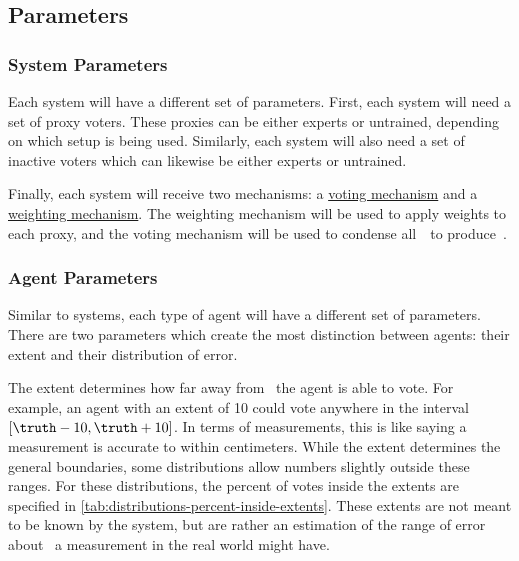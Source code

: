 \subsection{Parameters}\label{subsec:parameters}

\subsubsection{System Parameters}\label{subsubsec:system-parameters}
Each system will have a different set of parameters.
First, each system will need a set of proxy voters.
These proxies can be either experts or untrained, depending on which setup is
being used.
Similarly, each system will also need a set of inactive voters which can likewise
be either experts or untrained.

Finally, each system will receive two mechanisms: a
\hyperref[subsec:voting-mechanisms]{voting mechanism} and a
\hyperref[subsec:weighting-mechanisms]{weighting mechanism}.
The weighting mechanism will be used to apply weights to each proxy, and the
voting mechanism will be used to condense all~\agenttruth\ to produce~\systemtruth.

\subsubsection{Agent Parameters}\label{subsubsec:agent-parameters}
Similar to systems, each type of agent will have a different set of parameters.
There are two parameters which create the most distinction between agents: their
extent and their distribution of error.

The extent determines how far away from \truth\ the agent is able to vote.
For example, an agent with an extent of 10 could vote anywhere in the
interval $[\truth - 10, \truth + 10]$.
In terms of measurements, this is like saying a measurement is accurate to within
 centimeters.
While the extent determines the general boundaries, some distributions allow
numbers slightly outside these ranges.
For these distributions, the percent of votes inside the extents are
specified in \autoref{tab:distributions-percent-inside-extents}.
These extents are not meant to be known 
by the system, but are rather an
estimation of the range of error about \truth\ a measurement in the real world
might have.

